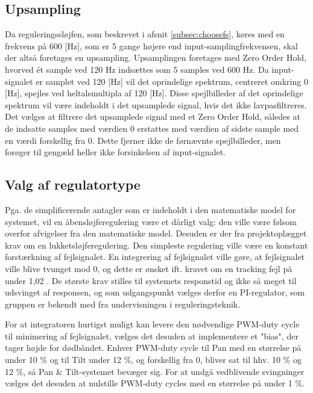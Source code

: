 \subsection{Upsampling}
Da reguleringssløjfen, som beskrevet i afsnit \ref{subsec:choosefs}, køres med en frekvens på 600 [Hz],
som er 5 gange højere end input-samplingfrekvensen, skal der altså foretages en upsampling.
Upsamplingen foretages med Zero Order Hold, hvorved ét sample ved 120 Hz indsættes 
som 5 samples ved 600 Hz.
Da input-signalet er samplet ved 120 [Hz] vil det oprindelige spektrum, centreret omkring 0 [Hz],
spejles ved heltalsmultipla af 120 [Hz]. Disse spejlbilleder af det oprindelige spektrum vil være
indeholdt i det upsamplede signal, hvis det ikke lavpasfiltreres. 
Det vælges at filtrere det upsamplede signal med et Zero Order Hold,
således at de indsatte samples med værdien 0 erstattes med værdien af sidste sample
med en værdi forskellig fra 0. Dette fjerner ikke de førnævnte spejlbilleder, men forøger
til gengæld heller ikke forsinkelsen af input-signalet.

\subsection{Valg af regulatortype}
Pga. de simplificerende antagler som er indeholdt i den matematiske model for systemet,
vil en åbensløjferegulering være et dårligt valg: den ville være følsom overfor afvigelser fra den
matematiske model. Desuden er der fra projektoplægget krav om en lukketsløjferegulering.
Den simpleste regulering ville være en konstant forstærkning af fejlsignalet.
En integrering af fejlsignalet ville gøre, at fejlsignalet ville blive tvunget mod 0,
og dette er ønsket ift. kravet om en tracking fejl på under 1,02 \degree.
De største krav stilles til systemets responstid og ikke så meget til udsvinget af responsen,
og som udgangspunkt vælges derfor en PI-regulator, som gruppen er bekendt med fra
undervisningen i reguleringsteknik.

For at integratoren hurtigst muligt kan levere den nødvendige PWM-duty cycle til minimering af fejlsignalet,
vælges det desuden at implementere et "bias", der tager højde for dødbåndet.
Enhver PWM-duty cycle til Pan med en størrelse på under 10 \% og til Tilt under 12 \%, og forskellig fra 0, bliver sat til hhv. 10 \% og 12 \%,
så Pan \& Tilt-systemet bevæger sig. For at undgå vedblivende svingninger vælges det desuden at nulstille
PWM-duty cycles med en størrelse på under 1 \%.
